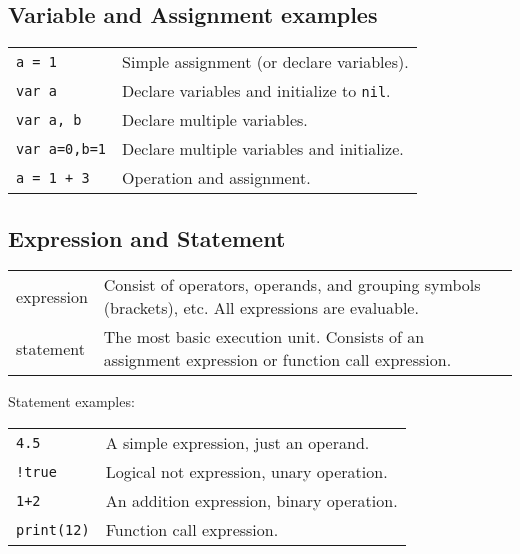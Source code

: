 \subsection*{Variable and Assignment examples}
\begin{tabular}{@{}ll}
    \texttt{a = 1} & Simple assignment (or declare variables). \\
    \texttt{var a} & Declare variables and initialize to \texttt{nil}. \\
    \texttt{var a, b} & Declare multiple variables. \\
    \texttt{var a=0,b=1} & Declare multiple variables and initialize. \\
    \texttt{a = 1 + 3} & Operation and assignment. \\
\end{tabular}

\subsection*{Expression and Statement}
\begin{tabular}{@{}lp{}}
    \textsf{expression} & Consist of operators, operands, and grouping symbols (brackets), etc. All expressions are evaluable. \\
    \textsf{statement} & The most basic execution unit. Consists of an assignment expression or function call expression. \\
\end{tabular}

\hangpar Statement examples:\\
\begin{tabular}{@{}ll}
    \texttt{4.5} & A simple expression, just an operand. \\
    \texttt{!true} & Logical not expression, unary operation. \\
    \texttt{1+2} & An addition expression, binary operation. \\
    \texttt{print(12)} & Function call expression. \\
\end{tabular}

